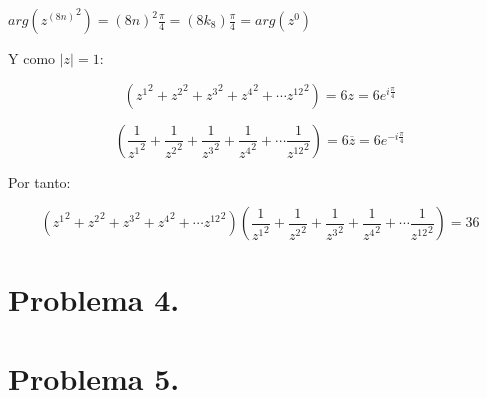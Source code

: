 \documentclass[11pt]{article}
\theoremstyle{Tema} \newtheorem{Tema}{Tema} %
\theoremstyle{Tema} \newtheorem{serie}{Serie}              %
\theoremstyle{Tema} \newtheorem{ejercicio}{Ejercicio}    %
\begin{document}
\begin{exercise}
$ arg({z^{(8n)}}^2)=(8n)^2\frac{\pi}{4}= (8k_8)\frac{\pi}{4}=arg(z^0)$


\bigskip

Y como $ |z|=1 $:

\begin{equation*}
\left({z^1}^2+{z^2}^2+{z^3}^2+{z^4}^2+\cdots{z^{12}}^2\right)=6z=6e^{i\frac{\pi}{4}}
\end{equation*}


\begin{equation*}
\left(\dfrac{1}{{z^1}^2}+\dfrac{1}{{z^2}^2}+\dfrac{1}{{z^3}^2}+\dfrac{1}{{z^4}^2}+\cdots\dfrac{1}{{z^{12}}^2}\right)=6\overline{z}=6e^{-i\frac{\pi}{4}}
\end{equation*}

Por tanto:

\begin{equation*}
\left({z^1}^2+{z^2}^2+{z^3}^2+{z^4}^2+\cdots{z^{12}}^2\right)\left(\dfrac{1}{{z^1}^2}+\dfrac{1}{{z^2}^2}+\dfrac{1}{{z^3}^2}+\dfrac{1}{{z^4}^2}+\cdots\dfrac{1}{{z^{12}}^2}\right)=36
\end{equation*}
\end{exercise}

\section*{\textbf{Problema 4.} }




\section*{\textbf{Problema 5.} }
\end{document}
